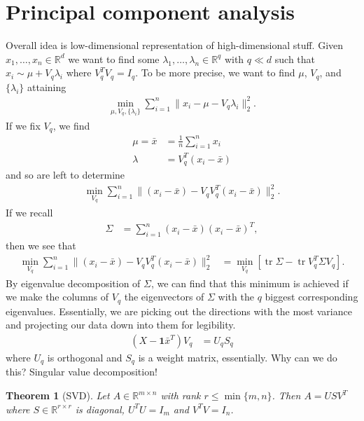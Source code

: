 \documentclass[11pt,letterpaper]{article}
\DeclareMathOperator{\tr}{tr}
\newcommand{\R}{\mathbb{R}}
\theoremstyle{definition}
\theoremstyle{plain}
\newtheorem{thm}{Theorem}[section]
\numberwithin{equation}{section}
\numberwithin{figure}{section}
\begin{document}
\section{Principal component analysis}
Overall idea is low-dimensional representation of high-dimensional stuff. Given $x_1,\ldots,x_n \in \R^d$ we want to find some $\lambda_1,\ldots,\lambda_n \in \R^q$ with $q \ll d$ such that $x_i \sim \mu + V_q \lambda_i$ where $V_q^T V_q = I_q$. To be more precise, we want to find $\mu$, $V_q$, and $\{\lambda_i\}$ attaining
%
\begin{align}
	\min_{\mu,V_q,\{\lambda_i\}} \sum_{i=1}^n \|x_i - \mu - V_q\lambda_i\|_2^2.
\end{align}
%
If we fix $V_q$, we find
%
\begin{align}
	\mu = \bar{x} &= \frac{1}{n} \sum_{i=1}^n x_i\\
	\lambda &= V_q^T (x_i - \bar{x})
\end{align}
%
and so are left to determine
%
\begin{align}
	\min_{V_q} \sum_{i=1}^n \|(x_i-\bar{x}) - V_q V_q^T (x_i - \bar{x})\|_2^2.
\end{align}
%
If we recall
%
\begin{align}
	\Sigma &= \sum_{i=1}^n (x_i-\bar{x})(x_i-\bar{x})^T,
\end{align}
%
then we see that
%
\begin{align}
	\min_{V_q} \sum_{i=1}^n \|(x_i-\bar{x}) - V_q V_q^T (x_i-\bar{x})\|_2^2 &= \min_{V_q} \left[\tr \Sigma - \tr V_q^T \Sigma V_q\right].
\end{align}
%
By eigenvalue decomposition of $\Sigma$, we can find that this minimum is achieved if we make the columns of $V_q$ the eigenvectors of $\Sigma$ with the $q$ biggest corresponding eigenvalues. Essentially, we are picking out the directions with the most variance and projecting our data down into them for legibility.
%
\begin{align}
	(X - \bm{1}\bar{x}^T) V_q &= U_q S_q
\end{align}
%
where $U_q$ is orthogonal and $S_q$ is a weight matrix, essentially. Why can we do this? Singular value decomposition!


\begin{thm}[SVD]
	Let $A \in \R^{m\times n}$ with rank $r \leq \min\{m,n\}$. Then $A = USV^T$ where $S \in \R^{r\times r}$ is diagonal, $U^T U = I_m$ and $V^T V = I_n$.
\end{thm}
\end{document}
